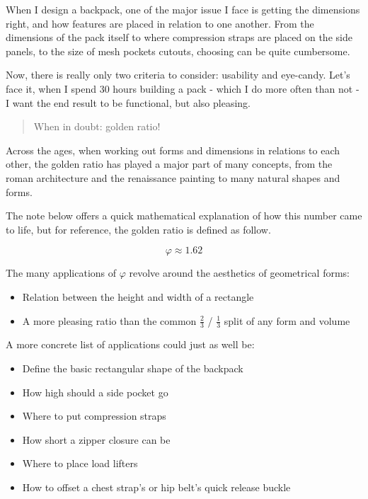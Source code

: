 When I design a backpack, one of the major issue I face is getting the dimensions right, and how features are placed in relation to one another. From the dimensions of the pack itself to where compression straps are placed on the side panels, to the size of mesh pockets cutouts, choosing can be quite cumbersome.

Now, there is really only two criteria to consider: usability and eye-candy. Let's face it, when I spend 30 hours building a pack - which I do more often than not - I want the end result to be functional, but also pleasing.

\begin{quote}
  When in doubt: golden ratio!
\end{quote}

Across the ages, when working out forms and dimensions in relations to each other, the golden ratio has played a major part of many concepts, from the roman architecture and the renaissance painting to many natural shapes and forms.

The note below offers a quick mathematical explanation of how this number came to life, but for reference, the golden ratio is defined as follow.

\begin{equation}
  \varphi \approx 1.62
\end{equation}

The many applications of $\varphi$ revolve around the aesthetics of geometrical forms:

\begin{itemize}
  \item Relation between the height and width of a rectangle
  \item A more pleasing ratio than the common $\tfrac{2}{3}$ / $\tfrac{1}{3}$ split of any form and volume
\end{itemize}

A more concrete list of applications could just as well be:

\begin{itemize}
  \item Define the basic rectangular shape of the backpack
  \item How high should a side pocket go
  \item Where to put compression straps
  \item How short a zipper closure can be
  \item Where to place load lifters
  \item How to offset a chest strap's or hip belt's quick release buckle
\end{itemize}

